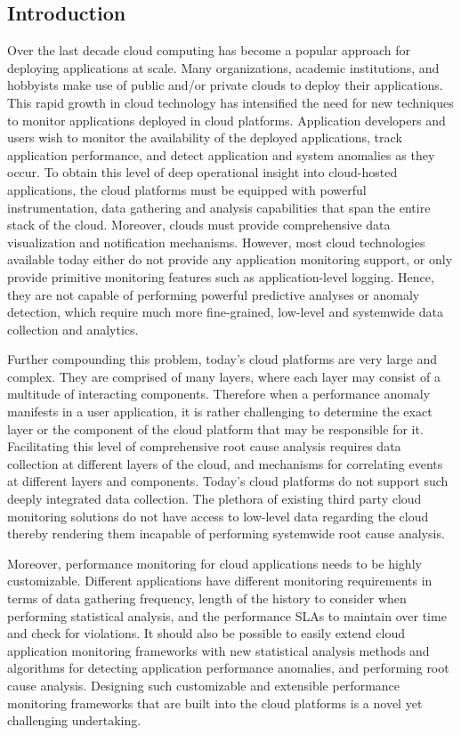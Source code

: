 \subsection{Introduction}
Over the last decade cloud computing has become a popular approach for deploying
applications at scale. Many organizations, academic institutions, and hobbyists make use of public
and/or private clouds to deploy their applications.
This rapid growth in cloud technology has intensified the need 
for new techniques to
monitor applications deployed in cloud platforms. Application developers and users wish
to monitor the availability of the deployed applications, track application performance, and detect 
application and system anomalies as they occur. To obtain this level of deep operational insight into
cloud-hosted applications, the cloud platforms must be equipped with powerful instrumentation,
data gathering and analysis capabilities that span the entire stack of the cloud. 
Moreover, clouds must provide comprehensive
data visualization and notification mechanisms. However, most cloud technologies available
today either do not provide any application monitoring support, or only provide primitive
monitoring features such as application-level logging. Hence, they are not capable of performing
powerful predictive analyses or anomaly detection, which require much more fine-grained, low-level
and systemwide data collection and analytics. 

Further compounding this problem, today's cloud platforms are very large and complex. They are
comprised of many layers, where each layer may consist of a multitude of interacting components.
Therefore when a performance anomaly manifests in a user application, it is rather challenging 
to determine the exact layer or the component of the cloud platform that may be responsible for it. 
Facilitating this level of comprehensive root cause analysis requires
data collection at different layers of the cloud, and mechanisms for correlating events at
different layers and components. Today's cloud platforms do not support such deeply integrated
data collection. The plethora of existing third party cloud monitoring solutions
do not have access to low-level data regarding the cloud thereby rendering them incapable
of performing systemwide root cause analysis.

Moreover, performance monitoring for cloud applications needs to be highly customizable. Different
applications have different monitoring requirements in terms of data gathering frequency, 
length of the history to consider when performing statistical analysis, and the performance 
SLAs to maintain over time and check for violations. It should also be possible to easily extend
cloud application monitoring frameworks with
new statistical analysis methods and algorithms for detecting application performance
anomalies, and performing root cause analysis. Designing such customizable and extensible performance
monitoring frameworks that are built into the cloud platforms is a novel yet challenging undertaking.

